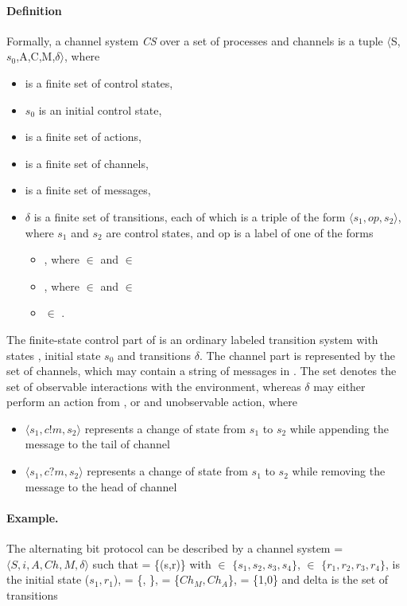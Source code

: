 \paragraph{Definition}
\label{CS}
Formally, a channel system \emph{CS} over a set of processes  and channels  is a tuple $\langle$S,$s_0$,A,C,M,$\delta$$\rangle$, where 
\begin{itemize}
\item[]
 is a finite set of control states,
\item[]
$s_0$ is an initial control state,
\item[]
 is a finite set of actions,
\item[]
 is a finite set of channels,
\item[]
 is a finite set of messages,
\item[]
$\delta$ is a finite set of transitions, each of which is a triple of the form $\langle s_1,op,s_2\rangle$, where $s_1$ and $s_2$ are control states, and op is a label of one of the forms

\begin{itemize}
\item
{}, where  $\in$  and  $\in$ 
\item
{}, where  $\in$  and  $\in$ 
\item
{} $\in$ .
\end{itemize}
\end{itemize}

The finite-state control part of  is an ordinary labeled transition system with states , initial state $s_0$ and transitions $\delta$. The channel part is represented by the set  of channels, which may contain a string of messages in . The set  denotes the set of observable interactions with the environment, whereas $\delta$ may either perform an action from , or and unobservable action, where

\begin{itemize}
\item[]
$\langle s_1, c!m, s_2\rangle$ represents a change of state from $s_1$ to $s_2$ while appending the message  to the tail of channel 
\item[]
$\langle s_1, c?m, s_2\rangle$ represents a change of state from $s_1$ to $s_2$ while removing the message  to the head of channel 
\end{itemize}

\paragraph{Example.} The alternating bit protocol can be described by a channel system  = $\langle S,i,A,Ch,M,\delta\rangle$ such that  = \{(s,r)\} with  $\in$ $\{s_1,s_2,s_3,s_4\}$,  $\in$ $\{r_1,r_2,r_3,r_4\}$,  is the initial state ($s_1,r_1$),  = \{, \},  = \{$Ch_M,Ch_A$\},  = \{1,0\} and delta is the set of transitions

